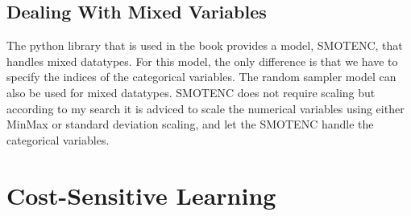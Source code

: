 \documentclass{article}
\begin{document}
\subsection{Dealing With Mixed Variables}
The python library that is used in the book provides a model, SMOTENC, that handles mixed datatypes. For this model, the only difference is that we have to specify the indices of the categorical variables. The random sampler model can also be used for mixed datatypes. SMOTENC does not require scaling but according to my search it is adviced to scale the numerical variables using either MinMax or standard deviation scaling, and let the SMOTENC handle the categorical variables.

\section{Cost-Sensitive Learning}
\end{document}
